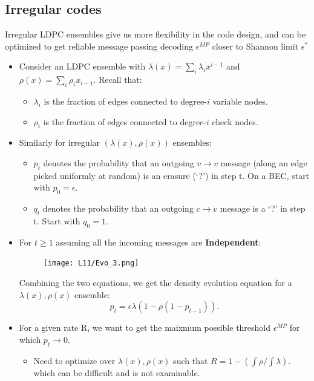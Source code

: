 \documentclass[12pt]{article}
\begin{document}
\subsection{Irregular codes}
Irregular LDPC ensembles give us more flexibility in the code design, and can be optimized to get reliable message passing decoding $\epsilon^{MP}$ closer to Shannon limit $\epsilon^*$
\begin{itemize}
    \item Consider an LDPC ensemble with $\lambda(x) = \sum_i \lambda_i x^{i-1}$ and $\rho(x) = \sum_{i}\rho_ix_{i-1}$. Recall that: 
    \begin{itemize}
        \item $\lambda_i$ is the fraction of edges connected to degree-$i$ variable nodes.
        \item $\rho_i$ is the fraction of edges connected to degree-$i$ check nodes.
    \end{itemize}
    \item Similarly for irregular $(\lambda(x),\rho(x))$ ensembles:
    \begin{itemize}
        \item $p_t$ denotes the probability that an outgoing $v\rightarrow c$ message (along an edge picked uniformly at random) is an erasure (`?') in step t. On a BEC, start with $p_0 = \epsilon$.
        \item $q_t$ denotes the probability that an outgoing $c\rightarrow v$ message is a `?' in step t.
        Start with $q_0 = 1$.
    \end{itemize}
    \item For $t \ge 1$ assuming all the incoming messages are \textbf{Independent}:
    \begin{figure}[H]
    \centering
    \texttt{[image: L11/Evo\_3.png]}
    \end{figure}
    \begin{center}
        Combining the two equations, we get the density evolution equation for a $\lambda(x),\rho(x)$ ensemble:
        \[
        p_t= \epsilon \lambda(1-\rho(1-p_{t-1})).
        \]
    \end{center}
    \item For a given rate R, we want to get the maixmum possible threshold $\epsilon^{MP}$ for which $p_t \rightarrow 0$.
    \begin{itemize}
        \item Need to optimize over $\lambda(x),\rho(x)$ such that $R = 1- (\int\rho/\int\lambda)$. which can be difficult and is not examinable.
    \end{itemize}
\end{itemize}
\end{document}
